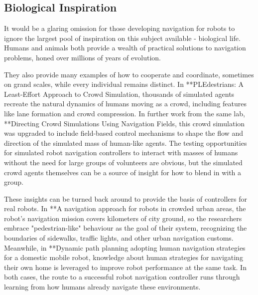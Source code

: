 \documentclass{sfuthesis}
\begin{document}



\subsection{Biological Inspiration}

It would be a glaring omission for those developing navigation for robots to ignore the largest pool of inspiration on this subject available - biological life. Humans and animals both provide a wealth of practical solutions to navigation problems, honed over millions of years of evolution.

They also provide many examples of how to cooperate and coordinate, sometimes on grand scales, while every individual remains distinct. In **PLEdestrians: A Least-Effort Approach to Crowd Simulation, thousands of simulated agents recreate the natural dynamics of humans moving as a crowd, including features like lane formation and crowd compression. In further work from the same lab, **Directing Crowd Simulations Using Navigation Fields, this crowd simulation was upgraded to include field-based control mechanisms to shape the flow and direction of the simulated mass of human-like agents. The testing opportunities for simulated robot navigation controllers to interact with masses of humans without the need for large groups of volunteers are obvious, but the simulated crowd agents themselves can be a source of insight for how to blend in with a group.

These insights can be turned back around to provide the basis of controllers for real robots. In **A navigation approach for robots in crowded urban areas, the robot's navigation mission covers kilometers of city ground, so the researchers embrace "pedestrian-like" behaviour as the goal of their system, recognizing the boundaries of sidewalks, traffic lights, and other urban navigation customs. Meanwhile, in **Dynamic path planning adopting human navigation strategies for a domestic mobile robot, knowledge about human strategies for navigating their own home is leveraged to improve robot performance at the same task. In both cases, the route to a successful robot navigation controller runs through learning from how humans already navigate these environments.
\end{document}
